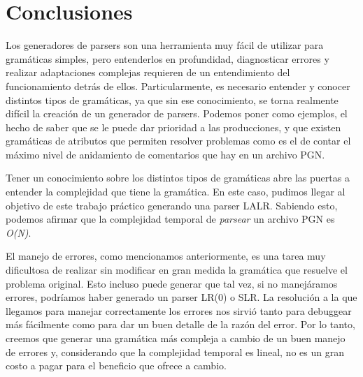 \section{Conclusiones}
Los generadores de parsers son una herramienta muy fácil de utilizar para
gramáticas simples, pero entenderlos en profundidad, diagnosticar errores y
realizar adaptaciones complejas requieren de un entendimiento del funcionamiento
detrás de ellos. Particularmente, es necesario entender y conocer distintos
tipos de gramáticas, ya que sin ese conocimiento, se torna realmente difícil la
creación de un generador de parsers. Podemos poner como ejemplos, el hecho de
saber que se le puede dar prioridad a las producciones, y que existen
gramáticas de atributos que permiten resolver problemas como es el de contar el
máximo nivel de anidamiento de comentarios que hay en un archivo PGN.

Tener un conocimiento sobre los distintos tipos de gramáticas abre las puertas
a entender la complejidad que tiene la gramática. En este caso, pudimos llegar
al objetivo de este trabajo práctico generando una parser LALR. Sabiendo esto,
podemos afirmar que la complejidad temporal de \textit{parsear} un archivo PGN es \textit{O(N)}.

El manejo de errores, como mencionamos anteriormente, es una tarea muy
dificultosa de realizar sin modificar en gran medida la gramática que resuelve
el problema original. Esto incluso puede generar que tal vez, si no manejáramos
errores, podríamos haber generado un parser LR(0) o SLR.
La resolución a la que llegamos para manejar correctamente los errores nos sirvió
tanto para debuggear más fácilmente como para dar un buen detalle de la
razón del error. Por lo tanto, creemos que generar una gramática más compleja
a cambio de un buen manejo de errores y, considerando que la complejidad temporal
es lineal, no es un gran costo a pagar para el beneficio que ofrece a cambio.
